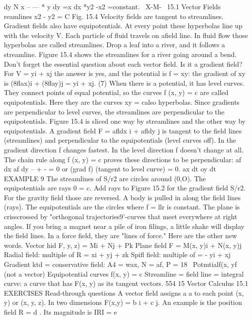 {dy N x -- --- * y dy =x dx *y2 -x2 =constant.
~X-M-~ 
15.1 Vector Fields
reamlines x2 - y2 = C
Fig. 15.4 Velocity fields are tangent to streamlines. Gradient fields also have equipotentials.
At every point these hyperbolas line up with the velocity V. Each particle of fluid
travels on afield line. In fluid flow those hyperbolas are called streamlines. Drop a
leaf into a river, and it follows a streamline. Figure 15.4 shows the streamlines for a
river going around a bend.
Don't forget the essential question about each vector field. Is it a gradient field?
For V = yi + xj the answer is yes, and the potential is f = xy:
the gradient of xy is (8flax)i + (8flay)j = yi + xj. (7)
When there is a potential, it has level curves. They connect points of equal potential,
so the curves f (x, y) = c are called equipotentials. Here they are the curves xy = calso
hyperbolas. Since gradients are perpendicular to level curves, the streamlines are
perpendicular to the equipotentials. Figure 15.4 is sliced one way by streamlines and
the other way by equipotentials.
A gradient field F = afldx i + afldy j is tangent to the field lines (streamlines)
and perpendicular to the equipotentials (level curves off).
In the gradient direction f changes fastest. In the level direction f doesn't change at
all. The chain rule along f (x, y) = c proves these directions to be perpendicular:
af dx af dy -- + - = 0 or (grad f) (tangent to level curve) = 0.
ax dt oy dt
EXAMPLE 9 The streamlines of S/r2 are circles around (0,O). The equipotentials are
rays 0 = c. Add rays to Figure 15.2 for the gradient field S/r2.
For the gravity field those are reversed. A body is pulled in along the field lines (rays).
The equipotentials are the circles where f = llr is constant. The plane is crisscrossed
by "orthogonal trajectories9'-curves that meet everywhere at right angles.
If you bring a magnet near a pile of iron filings, a little shake will display the field
lines. In a force field, they are "lines of force." Here are the other new words.
Vector hid F, y, z) = Mi + Nj + Pk Plane field F = M(x, y)i + N(x, y)j
Radial field: multiple of R = xi + yj + zk Spifl field: multiple of  = - yi + xj
Gradient ktd = conservative field: A4 = wax, N = af, P = 18~
Potmtialf(x, yf (not a vector) Equipotential curves f(x, y) = c
Streamline = field line = integral curve: a curve that has F(x, y) as its tangent
vectors. 
554 15 Vector Calculus
15.1 EXERCISES
Read-through questions
A vector field assigns a a to each point (x, y) or (x, y, z).
In two dimensions F(x,y) = b i + c j. An example is
the position field R = d . Its magnitude is IRI = e
}
